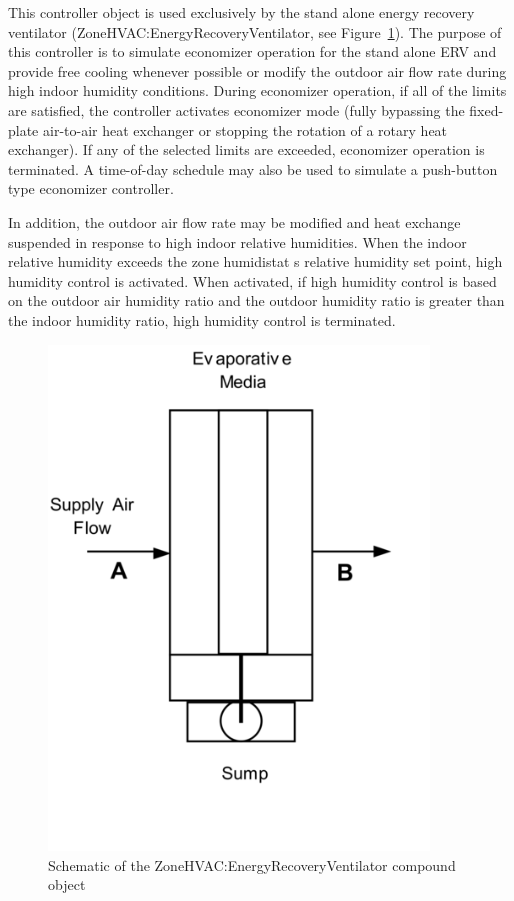 This controller object is used exclusively by the stand alone energy recovery ventilator (ZoneHVAC:EnergyRecoveryVentilator, see Figure~\ref{fig:schematic-of-the-zonehvac}). The purpose of this controller is to simulate economizer operation for the stand alone ERV and provide free cooling whenever possible or modify the outdoor air flow rate during high indoor humidity conditions. During economizer operation, if all of the limits are satisfied, the controller activates economizer mode (fully bypassing the fixed-plate air-to-air heat exchanger or stopping the rotation of a rotary heat exchanger). If any of the selected limits are exceeded, economizer operation is terminated. A time-of-day schedule may also be used to simulate a push-button type economizer controller.

In addition, the outdoor air flow rate may be modified and heat exchange suspended in response to high indoor relative humidities. When the indoor relative humidity exceeds the zone humidistat s relative humidity set point, high humidity control is activated. When activated, if high humidity control is based on the outdoor air humidity ratio and the outdoor humidity ratio is greater than the indoor humidity ratio, high humidity control is terminated.

\begin{figure}[hbtp] %
\centering
\includegraphics[width=0.9\textwidth, height=0.9\textheight, keepaspectratio=true]{media/image414.png}
\caption{Schematic of the ZoneHVAC:EnergyRecoveryVentilator compound object \protect \label{fig:schematic-of-the-zonehvac}}
\end{figure}

